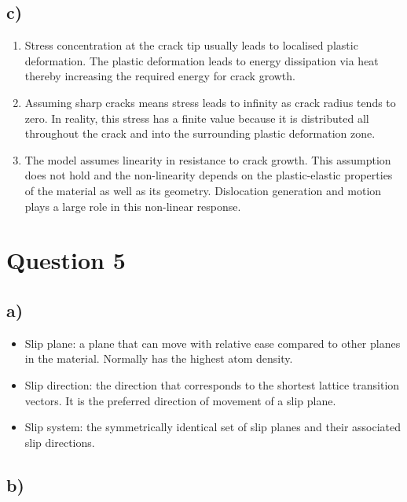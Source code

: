 \documentclass[a4paper]{article}
\begin{document}
	\subsection{c)}
	\begin{enumerate}
		\item Stress concentration at the crack tip usually leads to localised plastic deformation. The plastic deformation leads to energy dissipation via heat thereby increasing the required energy for crack growth.
		\item Assuming sharp cracks means stress leads to infinity as crack radius tends to zero. In reality, this stress has a finite value because it is distributed all throughout the crack and into the surrounding plastic deformation zone.
		\item The model assumes linearity in resistance to crack growth. This assumption does not hold and the non-linearity depends on the plastic-elastic properties of the material as well as its geometry. Dislocation generation and motion plays a large role in this non-linear response.
	\end{enumerate}
	
	\section{Question 5}
	\subsection{a)}
	\begin{itemize}
		\item Slip plane: a plane that can move with relative ease compared to other planes in the material. Normally has the highest atom density.
		\item Slip direction: the direction that corresponds to the shortest lattice transition vectors. It is the preferred direction of movement of a slip plane.
		\item Slip system: the symmetrically identical set of slip planes and their associated slip directions.
	\end{itemize}
	\subsection{b)}
\end{document}
